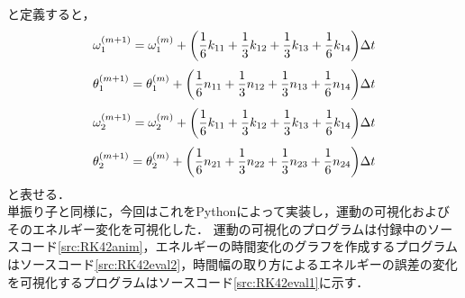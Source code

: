 \documentclass[a4paper,11pt]{jsarticle}
\begin{document}
と定義すると，
\begin{equation}
  \omega_1^{(m+1)} = \omega_1^{(m)} + \qty(\dfrac{1}{6}k_{11}+\dfrac{1}{3}k_{12}+\dfrac{1}{3}k_{13}+\dfrac{1}{6}k_{14})\Delta t
\end{equation}
\begin{equation}
  \theta_1^{(m+1)} = \theta_1^{(m)} + \qty(\dfrac{1}{6}n_{11}+\dfrac{1}{3}n_{12}+\dfrac{1}{3}n_{13}+\dfrac{1}{6}n_{14})\Delta t
\end{equation}
\begin{equation}
  \omega_2^{(m+1)} = \omega_2^{(m)} + \qty(\dfrac{1}{6}k_{11}+\dfrac{1}{3}k_{12}+\dfrac{1}{3}k_{13}+\dfrac{1}{6}k_{14})\Delta t
\end{equation}
\begin{equation}
  \theta_2^{(m+1)} = \theta_2^{(m)} + \qty(\dfrac{1}{6}n_{21}+\dfrac{1}{3}n_{22}+\dfrac{1}{3}n_{23}+\dfrac{1}{6}n_{24})\Delta t
\end{equation}
と表せる．\\
単振り子と同様に，今回はこれをPythonによって実装し，運動の可視化およびそのエネルギー変化を可視化した．
運動の可視化のプログラムは付録中のソースコード\ref{src:RK42anim}，エネルギーの時間変化のグラフを作成するプログラムはソースコード\ref{src:RK42eval2}，時間幅の取り方によるエネルギーの誤差の変化を可視化するプログラムはソースコード\ref{src:RK42eval1}に示す．\\
\newpage
\end{document}
